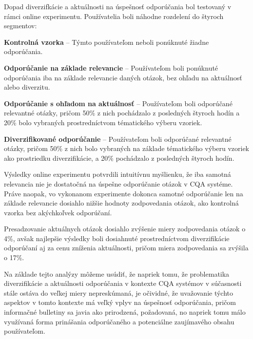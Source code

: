 Dopad diverzifkácie a aktuálnosti na úspešnosť odporúčania bol testovaný v rámci online experimentu. Používatelia boli náhodne
rozdelení do štyroch segmentov:

\begin{my_enumerate}
  \item{\textbf{Kontrolná vzorka} -- Týmto používateľom neboli ponúknuté žiadne odporúčania.}
  \item{\textbf{Odporúčanie na základe relevancie} -- Používateľom boli ponúknuté odporúčania iba na základe relevancie
        daných otázok, bez ohľadu na aktuálnosť alebo diverzitu.}
  \item{\textbf{Odporúčanie s ohľadom na aktuálnosť} -- Používateľom boli odporúčané relevantné otázky, pričom 50\% z nich
        pochádzalo z posledných štyroch hodín a 20\% bolo vybraných prostredníctvom tématického výberu vzoriek.}
  \item{\textbf{Diverzifikované odporúčanie} -- Používateľom boli odporúčané relevantné otázky, pričom 50\% z nich
        bolo vybraných na základe tématického výberu vzoriek ako prostriedku diverzifikácie, a 20\% pochádzalo z posledných
        štyroch hodín.}
\end{my_enumerate}

Výsledky online experimentu potvrdili intuitívnu myšlienku, že iba samotná relevancia nie je dostatočná na úspešne
odporúčanie otázok v CQA systéme. Práve naopak, vo vykonanom experimente dokonca samotné odporúčanie len na základe
relevancie dosiahlo nižšie hodnoty zodpovedania otázok, ako kontrolná vzorka bez akýchkoľvek odporúčaní.

Presadzovanie aktuálnych otázok dosiahlo zvýšenie miery zodpovedania otázok o 4\%, avšak najlepšie výsledky boli dosiahnuté
prostredníctvom diverzifikácie odporúčaní aj za cenu zníženia aktuálnosti, pričom miera zodpovedania sa zvýšila o 17\%.

\vspace*{1.5cm}

Na základe tejto analýzy môžeme usúdiť, že napriek tomu, že problematika diverzifikácie a aktuálnosti odporúčania v kontexte
CQA systémov v súčasnosti stále ostáva do veľkej miery nepreskúmaná, je očividné, že uvažovanie týchto aspektov v tomto
kontexte má veľký vplyv na úspešnosť odporúčania, pričom informačné bulletiny sa javia ako prirodzená, požadovaná,
no napriek tomu málo využívaná forma prinášania odporúčaného a potenciálne zaujímavého obsahu používateľom.
